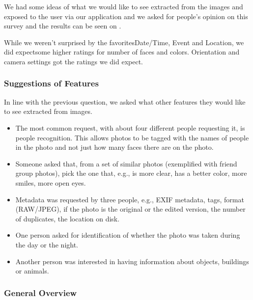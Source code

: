 We had some ideas of what we would like to see extracted from the images and exposed to the user via our application and we asked for people's opinion on this survey and the results can be seen on .

While we weren't surprised by the favorites\linebreak Date/Time, Event and Location, we did expect\linebreak some higher ratings for number of faces and colors. Orientation and camera settings got the ratings we did expect.




\subsubsection{Suggestions of Features} %
\label{ssub:suggestions_of_features}

In line with the previous question, we asked what other features they would like to see extracted from images.

\begin{itemize}
	\item The most common request, with about four different people requesting it, is people recognition. This allows photos to be tagged with the names of people in the photo and not just how many faces there are on the photo.

	\item Someone asked that, from a set of similar photos (exemplified with friend group photos), pick the one that, e.g., is more clear, has a better color, more smiles, more open eyes.

	\item Metadata was requested by three people, e.g., EXIF metadata, tags, format (RAW/JPEG), if the photo is the original or the edited version, the number of duplicates, the location on disk.

	\item One person asked for identification of whether the photo was taken during the day or the night.

	\item Another person was interested in having information about objects, buildings or animals.
\end{itemize}


\subsubsection{General Overview} %
\label{ssub:general_overview}

